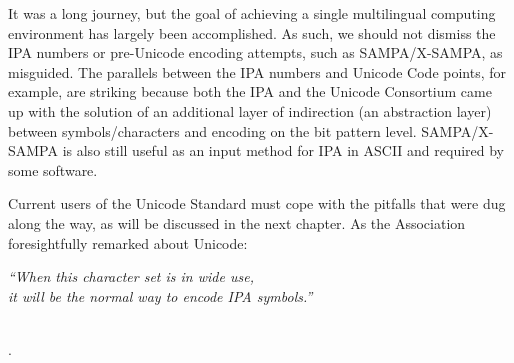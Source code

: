 
It was a long journey, but the goal of achieving a single multilingual computing
environment has largely been accomplished. As such, we should not dismiss the IPA numbers 
or pre-Unicode encoding attempts, such as SAMPA/X-SAMPA, as misguided. The parallels 
between the IPA numbers and Unicode Code points, for example, are striking because both the IPA and 
the Unicode Consortium came up with the solution of an additional layer of indirection (an abstraction layer) 
between symbols/characters and encoding on the bit pattern level. SAMPA/X-SAMPA is also still useful 
as an input method for IPA in ASCII and required by some software.

Current users of the Unicode Standard must cope
with the pitfalls that were dug along the way, as will be discussed in the next
chapter. As the Association foresightfully remarked about Unicode:

\begin{center} 

\textit{``When this character set is in wide use, \\
it will be the normal way to encode IPA symbols.''}

\ \\

\citep[164]{IPA1999}.

\end{center}



